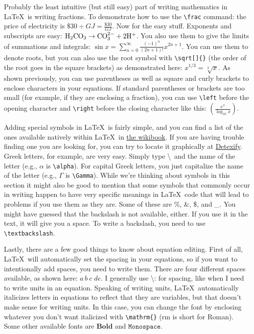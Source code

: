 \documentclass[english,12pt]{article}
\begin{document}
Probably the least intuitive (but still easy) part of writing mathematics in \LaTeX \ is writing fractions. To demonstrate how to use the \texttt{\textbackslash frac} command: the price of electricity is $\$30\div GJ=\frac{\$30}{GJ}$. Now for the easy stuff. Exponents and subscripts are easy: $\rm{H_2CO_3\to CO_3^{2-}+2H^+}$. You also use them to give the limits of summations and integrals: $\sin x=\sum^\infty_{n=0}\frac{(-1)^n}{(2n+1)!}x^{2n+1}$. You can use them to denote roots, but you can also use the root symbol with \texttt{\textbackslash sqrt[]\{\}} (the order of the root goes in the square brackets) as demonstrated here: $x^{1/3}=\sqrt[3]{x}$. As shown previously, you can use parentheses as well as square and curly brackets to enclose characters in your equations. If standard parentheses or brackets are too small (for example, if they are enclosing a fraction), you can use \texttt{\textbackslash left} before the opening character and \texttt{\textbackslash right} before the closing character like this: $\left(\frac{e^x}{\log_{10}x}\right)$.

Adding special symbols in \LaTeX \ is fairly simple, and you can find a list of the ones available natively within 
\LaTeX \ in \href{https://en.wikibooks.org/wiki/LaTeX/Mathematics}{the wikibook}. If you are having trouble finding one you are looking for, you can try to locate it graphically at \href{http://detexify.kirelabs.org/classify.html}{Detexify}. Greek letters, for example, are very easy. Simply type \textbackslash \ and the name of the letter (e.g., $\alpha$ is \texttt{\textbackslash alpha}). For capital Greek letters, you just capitalize the name of the letter (e.g., $\Gamma$ is \texttt{\textbackslash Gamma}). While we're thinking about symbols in this section it might also be good to mention that some symbols that commonly occur in writing happen to have very specific meanings in \LaTeX \ code that will lead to problems if you use them as they are. Some of these are \%, \&, \$, and \_. You might have guessed that the backslash is not available, either. If you use it in the text, it will give you a space. To write a backslash, you need to use \texttt{\textbackslash textbackslash}.

Lastly, there are a few good things to know about equation editing. First of all, \LaTeX \ will automatically set the spacing in your equations, so if you want to intentionally add spaces, you need to write them. There are four different spaces available, as shown here: $a\,b\:c\;d\!e$. I generally use \textbackslash : for spacing, like when I need to write units in an equation. Speaking of writing units, \LaTeX \ automatically italicizes letters in equations to reflect that they are variables, but that doesn't make sense for writing units. In this case, you can change the font by enclosing whatever you don't want italicized with \texttt{\textbackslash mathrm\{\}} (rm is short for Roman). Some other available fonts are $\mathbf{Bold}$ and $\mathtt{Monospace}$.
\end{document}
